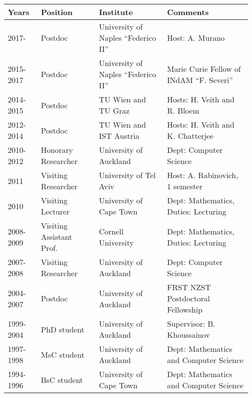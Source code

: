 \documentclass[10pt,a4paper,sans]{moderncv}
\begin{document}

\begin{tabular}{|l|l|l|l|}
 \hline 
 Years 	 & Position 								& Institute & Comments\\
 \hline \hline 
 2017-	 & Postdoc	& University of Naples ``Federico II'' & Host: A. Murano\\
 2015-2017 & Postdoc	& University of Naples ``Federico II'' & Marie Curie Fellow of INdAM ``F. Severi''\\
 2014-2015 & Postdoc	& TU Wien and TU Graz & Hosts: H. Veith and R. Bloem\\
 2012-2014 & Postdoc	& TU Wien and IST Austria & Hosts: H. Veith and K. Chatterjee\\
 2010-2012 & Honorary Researcher & University of Auckland & Dept: Computer Science\\
 2011	 & Visiting Researcher & University of Tel Aviv & Host: A. Rabinovich, 1 semester\\
 2010	 & Visiting Lecturer   & University of Cape Town & Dept: Mathematics, Duties: Lecturing\\
 2008-2009 & Visiting Assistant Prof. & Cornell University & Dept: Mathematics, Duties: Lecturing\\
 2007-2008 & Visiting Researcher & University of Auckland & Dept: Computer Science\\
 2004-2007 & Postdoc	& University of Auckland & FRST NZST Postdoctoral Fellowship\\
 \hline
 \hline
 1999-2004 & PhD student & University of Auckland & Supervisor: B. Khoussainov\\
 1997-1998 & MsC student & University of Auckland & Dept: Mathematics and Computer Science\\
 1994-1996 & BsC student & University of Cape Town & Dept: Mathematics and Computer Science\\
 \hline
\end{tabular}



% 
\end{document}
